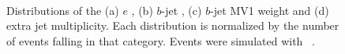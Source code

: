 \begin{figure}
\centering
{}
\\
\caption{Distributions of the (a) $e$ \pt, (b) $b$-jet \pt, (c) $b$-jet MV1 weight and (d) extra jet multiplicity. Each distribution is normalized by the number of events falling in that category. Events were simulated with \powpy~\ttbar.}
\label{fig:reconottruth}
\end{figure}


